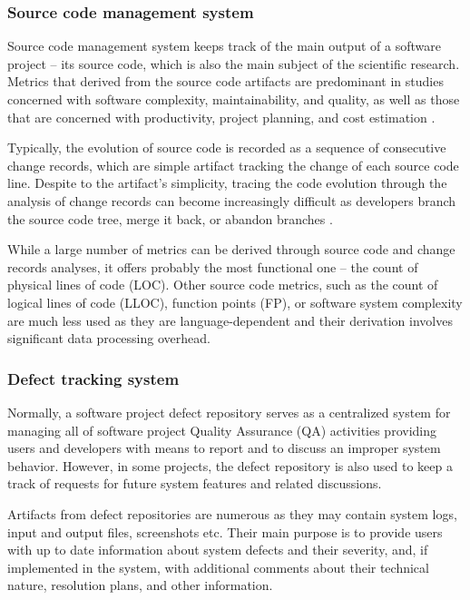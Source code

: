 \subsubsection{Source code management system}
Source code management system keeps track of the main output of a software project -- its source code, which is also the 
main subject of the scientific research. Metrics that derived from the source code artifacts are predominant in studies concerned 
with software complexity, maintainability, and quality, as well as those that are concerned with productivity, project planning, 
and cost estimation \cite{citeulike:4534888}. 

Typically, the evolution of source code is recorded as a sequence of consecutive change records, which are simple artifact
tracking the change of each source code line. Despite to the artifact's simplicity, tracing the code evolution through the analysis 
of change records can become increasingly difficult as developers branch the source code tree, merge it back, or abandon 
branches \cite{citeulike:13156191}.

While a large number of metrics can be derived through source code and change records analyses, it offers probably 
the most functional one -- the count of physical lines of code (LOC). Other source code metrics, such as the count of logical lines 
of code (LLOC), function points (FP), or software system complexity are much less used as they are language-dependent and their 
derivation involves significant data processing overhead.

\subsubsection{Defect tracking system}
Normally, a software project defect repository serves as a centralized system for managing all of software project 
Quality Assurance (QA) activities providing users and developers with means to report and to discuss an improper system behavior.
However, in some projects, the defect repository is also used to keep a track of requests for future system features and related
discussions.

Artifacts from defect repositories are numerous as they may contain system logs, input and output files, screenshots etc. 
Their main purpose is to provide users with up to date information about system defects and their severity, and, if implemented 
in the system, with additional comments about their technical nature, resolution plans, and other information. 

